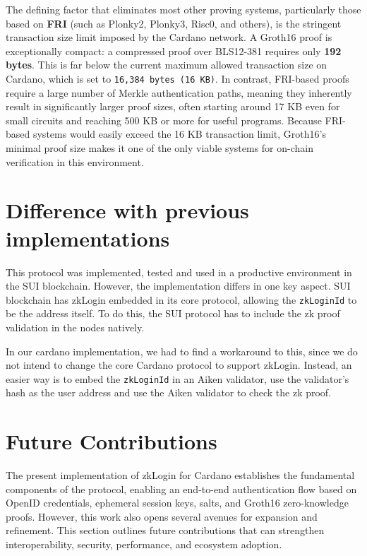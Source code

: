 \documentclass{article}
\begin{document}
The defining factor that eliminates most other proving systems, particularly those based on \textbf{FRI} (such as Plonky2, Plonky3, Risc0, and others), is the stringent transaction size limit imposed by the Cardano network. A Groth16 proof is exceptionally compact: a compressed proof over BLS12-381 requires only \textbf{192 bytes}. This is far below the current maximum allowed transaction size on Cardano, which is set to \texttt{16,384 bytes (16 KB)}. In contrast, FRI-based proofs require a large number of Merkle authentication paths, meaning they inherently result in significantly larger proof sizes, often starting around 17 KB even for small circuits and reaching 500 KB or more for useful programs. Because FRI-based systems would easily exceed the 16 KB transaction limit, Groth16's minimal proof size makes it one of the only viable systems for on-chain verification in this environment.
    
\section{Difference with previous implementations}
This protocol was implemented, tested and used in a productive environment in the SUI blockchain. However, the implementation differs in one key aspect. SUI blockchain has zkLogin embedded in its core protocol, allowing the \texttt{zkLoginId} to be the address itself. To do this, the SUI protocol has to include the zk proof validation in the nodes natively.

In our cardano implementation, we had to find a workaround to this, since we do not intend to change the core Cardano protocol to support zkLogin. Instead, an easier way is to embed the \texttt{zkLoginId} in an Aiken validator, use the validator's hash as the user address and use the Aiken validator to check the zk proof.

\section{Future Contributions}

The present implementation of zkLogin for Cardano establishes the fundamental components of the protocol, enabling an end-to-end authentication flow based on OpenID credentials, ephemeral session keys, salts, and Groth16 zero-knowledge proofs. However, this work also opens several avenues for expansion and refinement. This section outlines future contributions that can strengthen interoperability, security, performance, and ecosystem adoption.
\end{document}
